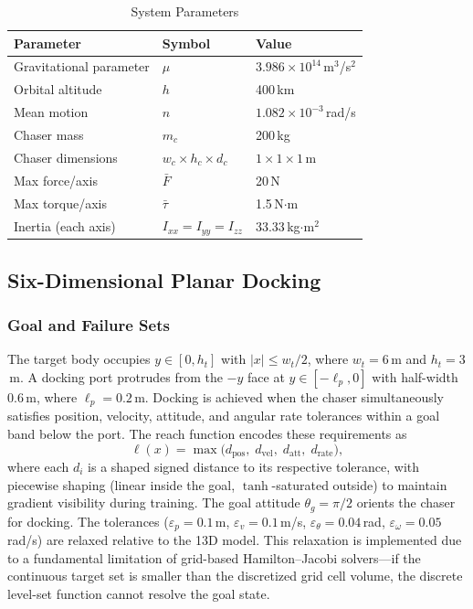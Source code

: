 \documentclass[letterpaper, 10 pt, conference]{ieeeconf}
\begin{document}
\begin{table}[t]
\caption{System Parameters}
\label{tab:params}
\centering
\begin{tabular}{lll}
\toprule
Parameter & Symbol & Value \\
\midrule
Gravitational parameter & $\mu$ & $3.986\times10^{14}$\,m$^3$/s$^2$ \\
Orbital altitude & $h$ & 400\,km \\
Mean motion & $n$ & $1.082\times10^{-3}$\,rad/s \\
Chaser mass & $m_c$ & 200\,kg \\
Chaser dimensions & $w_c\!\times\!h_c\!\times\!d_c$ & $1\!\times\!1\!\times\!1$\,m \\
Max force/axis & $\bar{F}$ & 20\,N \\
Max torque/axis & $\bar{\tau}$ & 1.5\,N$\cdot$m \\
Inertia (each axis) & $I_{xx}\!=\!I_{yy}\!=\!I_{zz}$ & 33.33\,kg$\cdot$m$^2$ \\
\bottomrule
\end{tabular}
\end{table}

\subsection{Six-Dimensional Planar Docking}

\subsubsection{Goal and Failure Sets}

The target body occupies $y \in [0, h_t]$ with $|x| \leq w_t/2$, where $w_t = 6$\,m and $h_t = 3$\,m. A docking port protrudes from the $-y$ face at $y \in [-\ell_p, 0]$ with half-width $0.6$\,m, where $\ell_p = 0.2$\,m. Docking is achieved when the chaser simultaneously satisfies position, velocity, attitude, and angular rate tolerances within a goal band below the port. The reach function encodes these requirements as
\begin{equation}\label{eq:reach_fn}
\ell(x) = \max\!\big(d_{\mathrm{pos}},\; d_{\mathrm{vel}},\; d_{\mathrm{att}},\; d_{\mathrm{rate}}\big),
\end{equation}
where each $d_i$ is a shaped signed distance to its respective tolerance, with piecewise shaping (linear inside the goal, $\tanh$-saturated outside) to maintain gradient visibility during training. The goal attitude $\theta_g = \pi/2$ orients the chaser for docking. The tolerances ($\varepsilon_p = 0.1$\,m, $\varepsilon_v = 0.1$\,m/s, $\varepsilon_\theta = 0.04$\,rad, $\varepsilon_\omega = 0.05$\,rad/s) are relaxed relative to the 13D model. This relaxation is implemented due to  a fundamental limitation of grid-based Hamilton--Jacobi solvers---if the continuous target set is smaller than the discretized grid cell volume, the discrete level-set function cannot resolve the goal state. 
\end{document}
